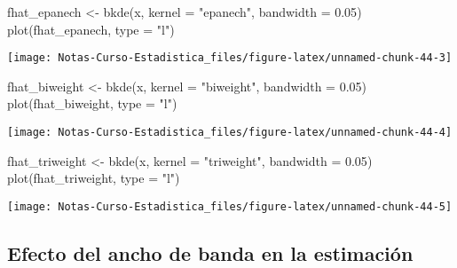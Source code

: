 \documentclass[
  12pt,
]{book}
\newenvironment{Shaded}{\begin{snugshade}}{\end{snugshade}}
\newcommand{\AttributeTok}[1]{\textcolor[rgb]{0.77,0.63,0.00}{#1}}
\newcommand{\FloatTok}[1]{\textcolor[rgb]{0.00,0.00,0.81}{#1}}
\newcommand{\FunctionTok}[1]{\textcolor[rgb]{0.00,0.00,0.00}{#1}}
\newcommand{\NormalTok}[1]{#1}
\newcommand{\OtherTok}[1]{\textcolor[rgb]{0.56,0.35,0.01}{#1}}
\newcommand{\StringTok}[1]{\textcolor[rgb]{0.31,0.60,0.02}{#1}}
\theoremstyle{definition}
\theoremstyle{definition}
\theoremstyle{definition}
\theoremstyle{definition}
\theoremstyle{remark}
\begin{document}
\begin{Shaded}
\begin{Highlighting}[]
\NormalTok{fhat\_epanech }\OtherTok{\textless{}{-}} \FunctionTok{bkde}\NormalTok{(x, }\AttributeTok{kernel =} \StringTok{"epanech"}\NormalTok{, }\AttributeTok{bandwidth =} \FloatTok{0.05}\NormalTok{)}
\FunctionTok{plot}\NormalTok{(fhat\_epanech, }\AttributeTok{type =} \StringTok{"l"}\NormalTok{)}
\end{Highlighting}
\end{Shaded}

\begin{center}\texttt{[image: Notas-Curso-Estadistica\_files/figure-latex/unnamed-chunk-44-3]} \end{center}

\begin{Shaded}
\begin{Highlighting}[]
\NormalTok{fhat\_biweight }\OtherTok{\textless{}{-}} \FunctionTok{bkde}\NormalTok{(x, }\AttributeTok{kernel =} \StringTok{"biweight"}\NormalTok{, }\AttributeTok{bandwidth =} \FloatTok{0.05}\NormalTok{)}
\FunctionTok{plot}\NormalTok{(fhat\_biweight, }\AttributeTok{type =} \StringTok{"l"}\NormalTok{)}
\end{Highlighting}
\end{Shaded}

\begin{center}\texttt{[image: Notas-Curso-Estadistica\_files/figure-latex/unnamed-chunk-44-4]} \end{center}

\begin{Shaded}
\begin{Highlighting}[]
\NormalTok{fhat\_triweight }\OtherTok{\textless{}{-}} \FunctionTok{bkde}\NormalTok{(x, }\AttributeTok{kernel =} \StringTok{"triweight"}\NormalTok{, }\AttributeTok{bandwidth =} \FloatTok{0.05}\NormalTok{)}
\FunctionTok{plot}\NormalTok{(fhat\_triweight, }\AttributeTok{type =} \StringTok{"l"}\NormalTok{)}
\end{Highlighting}
\end{Shaded}

\begin{center}\texttt{[image: Notas-Curso-Estadistica\_files/figure-latex/unnamed-chunk-44-5]} \end{center}

\hypertarget{efecto-del-ancho-de-banda-en-la-estimaciuxf3n}{%
\subsection{Efecto del ancho de banda en la estimación}\label{efecto-del-ancho-de-banda-en-la-estimaciuxf3n}}
\end{document}

